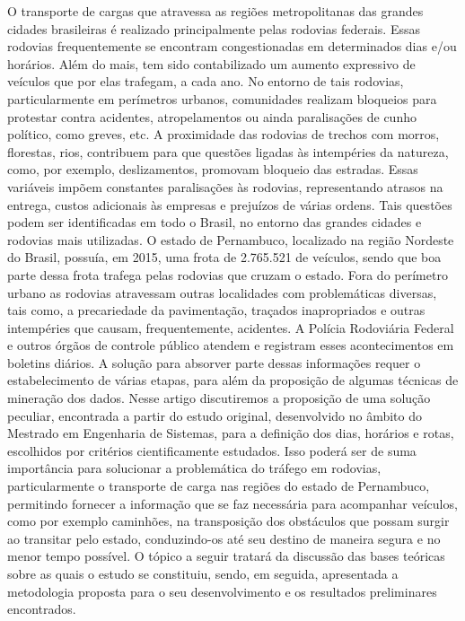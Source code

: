 \documentclass[conference,compsoc]{IEEEtran}
\begin{document}
O transporte
de cargas que atravessa as regiões metropolitanas das grandes cidades brasileiras é realizado principalmente pelas rodovias
federais. Essas rodovias frequentemente se encontram congestionadas
em determinados dias e/ou horários. Além do mais, tem sido
contabilizado um aumento expressivo de veículos que por elas
trafegam, a cada ano. No entorno de tais rodovias, particularmente em
perímetros urbanos, comunidades realizam bloqueios para protestar
contra acidentes, atropelamentos ou ainda paralisações de cunho
político, como greves, etc. A proximidade das rodovias de trechos
com morros, florestas, rios, contribuem para que questões ligadas às
intempéries da natureza, como, por exemplo, deslizamentos,
promovam bloqueio das estradas. Essas variáveis impõem constantes
paralisações às rodovias, representando atrasos na entrega, custos
adicionais às empresas e prejuízos de várias ordens.
Tais questões podem ser identificadas em todo o Brasil, no entorno das grandes cidades e rodovias mais utilizadas. 
O estado de Pernambuco, localizado na região Nordeste do Brasil, possuía, em 2015, uma frota de 2.765.521 de veículos, 
sendo que boa parte dessa frota trafega pelas rodovias que cruzam o estado. 
Fora do perímetro urbano as rodovias atravessam outras localidades
com problemáticas diversas, tais como, a precariedade da pavimentação, traçados inapropriados e outras intempéries que
causam, frequentemente, acidentes. A Polícia Rodoviária Federal e
outros órgãos de controle público atendem e registram esses acontecimentos em boletins diários.
A solução para absorver parte dessas informações
requer o estabelecimento de várias etapas, para além da proposição de algumas técnicas de
mineração dos dados. Nesse artigo discutiremos a proposição de uma
solução peculiar, encontrada a partir do estudo original, desenvolvido
no âmbito do Mestrado em Engenharia de Sistemas, para a definição dos dias, horários e rotas, escolhidos por critérios
cientificamente estudados. Isso poderá ser de suma importância para
solucionar a problemática do tráfego em rodovias, particularmente o transporte de carga nas regiões 
do estado de Pernambuco, permitindo fornecer a informação que se faz
necessária para acompanhar veículos, como por exemplo
caminhões, na transposição dos obstáculos que possam surgir ao
transitar pelo estado, conduzindo-os até seu destino de maneira
segura e no menor tempo possível.
O tópico a seguir tratará da discussão das bases teóricas sobre as quais
o estudo se constituiu, sendo, em seguida, apresentada a metodologia
proposta para o seu desenvolvimento e os resultados preliminares
encontrados.
\end{document}
